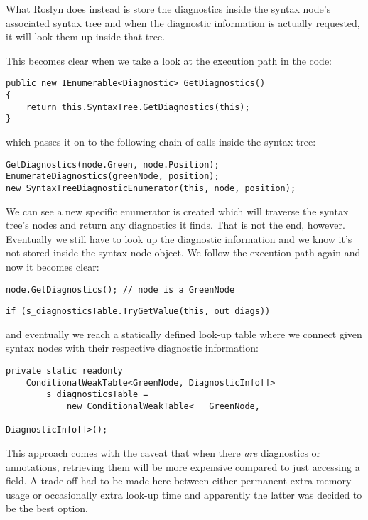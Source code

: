 What Roslyn does instead is store the diagnostics inside the syntax node's associated syntax tree and when the diagnostic information is actually requested, it will look them up inside that tree.

\noindent This becomes clear when we take a look at the execution path in the code:

\begin{lstlisting}
public new IEnumerable<Diagnostic> GetDiagnostics()
{
	return this.SyntaxTree.GetDiagnostics(this);
}
\end{lstlisting}

\noindent which passes it on to the following chain of calls inside the syntax tree:

\begin{lstlisting}
GetDiagnostics(node.Green, node.Position);
EnumerateDiagnostics(greenNode, position);
new SyntaxTreeDiagnosticEnumerator(this, node, position);
\end{lstlisting}

\noindent We can see a new specific enumerator is created which will traverse the syntax tree's nodes and return any diagnostics it finds. That is not the end, however. Eventually we still have to look up the diagnostic information and we know it's not stored inside the syntax node object. We follow the execution path again and now it becomes clear:

\begin{lstlisting}
node.GetDiagnostics(); // node is a GreenNode
\end{lstlisting}

\begin{lstlisting}
if (s_diagnosticsTable.TryGetValue(this, out diags))
\end{lstlisting}

\noindent and eventually we reach a statically defined look-up table where we connect given syntax nodes with their respective diagnostic information:

\begin{lstlisting}
private static readonly 
	ConditionalWeakTable<GreenNode, DiagnosticInfo[]> 
		s_diagnosticsTable =
			new ConditionalWeakTable<	GreenNode, 
																DiagnosticInfo[]>();
\end{lstlisting}

This approach comes with the caveat that when there \textit{are} diagnostics or annotations, retrieving them will be more expensive compared to just accessing a field. A trade-off had to be made here between either permanent extra memory-usage or occasionally extra look-up time and apparently the latter was decided to be the best option.
